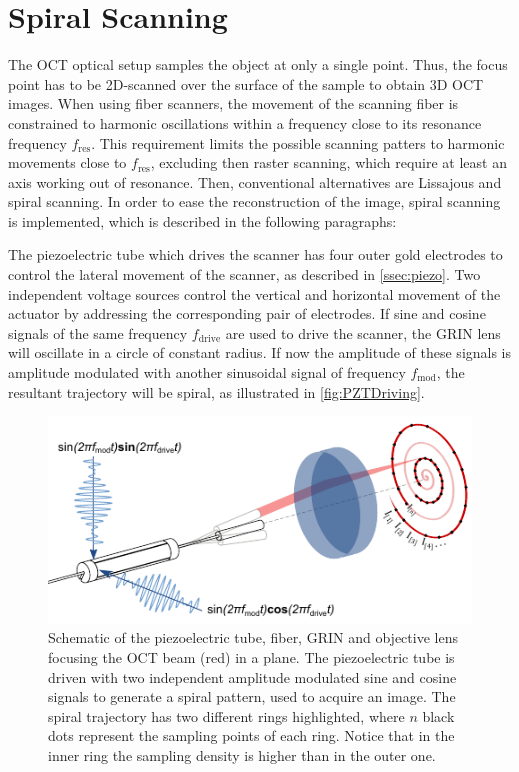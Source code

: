 \documentclass[10pt]{iopart}
\begin{document}
\section{Spiral Scanning}

The OCT optical setup samples the object at only a single point. Thus, the focus point has to be 2D-scanned over the surface of the sample to obtain 3D OCT images. When using fiber scanners, the movement of the scanning fiber is constrained to harmonic oscillations within a frequency close to its resonance frequency $f_\mathrm{res}$. This requirement limits the possible scanning patters to harmonic movements close to $f_\mathrm{res}$, excluding then raster scanning, which require at least an axis working out of resonance. Then, conventional alternatives are Lissajous \cite{Moon2010} and spiral scanning. In order to ease the reconstruction of the image, spiral scanning is implemented, which is described in the following paragraphs:

The piezoelectric tube which drives the scanner has four outer gold electrodes to control the lateral movement of the scanner, as described in \autoref{ssec:piezo}. Two independent voltage sources control the vertical and horizontal movement of the actuator by addressing the corresponding pair of electrodes. If sine and cosine signals of the same frequency $f_\mathrm{drive}$ are used to drive the scanner, the GRIN lens will oscillate in a circle of constant radius. If now the amplitude of these signals is amplitude modulated with another sinusoidal signal of frequency $f_\mathrm{mod}$, the resultant trajectory will be spiral, as illustrated in \autoref{fig:PZTDriving}.

\begin{figure}[h!]\centering \includegraphics[width=\columnwidth]{figures/PZTDrivingMoving.pdf}
      \caption{Schematic of the piezoelectric tube, fiber, GRIN and objective lens focusing the OCT beam (red) in a plane. 
      The piezoelectric tube is driven with two independent amplitude modulated sine and cosine signals to generate a spiral pattern, used to acquire an image. The spiral trajectory has two different rings highlighted, where $n$ black dots represent the sampling points of each ring. Notice that in the inner ring the sampling density is higher than in the outer one.
      }
      \label{fig:PZTDriving}
\end{figure}
\end{document}
